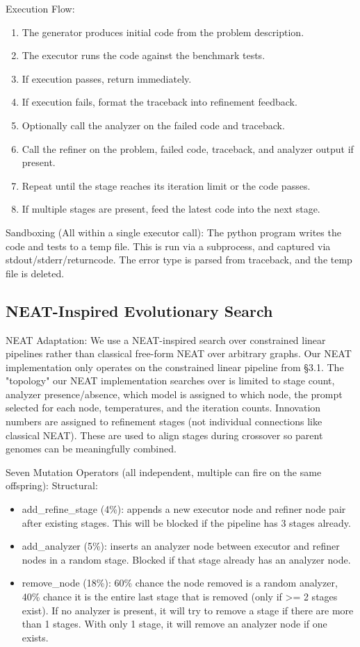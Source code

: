 \documentclass{article}
\begin{document}
Execution Flow:
\begin{enumerate}
    \item The generator produces initial code from the problem description.
    \item The executor runs the code against the benchmark tests.
    \item If execution passes, return immediately.
    \item If execution fails, format the traceback into refinement feedback.
    \item Optionally call the analyzer on the failed code and traceback.
    \item Call the refiner on the problem, failed code, traceback, and analyzer output if present.
    \item Repeat until the stage reaches its iteration limit or the code passes.
    \item If multiple stages are present, feed the latest code into the next stage.
\end{enumerate}

Sandboxing (All within a single executor call):
The python program writes the code and tests to a temp file. This is run via a subprocess, and captured via stdout/stderr/returncode. The error type is parsed from traceback, and the temp file is deleted.

\subsection{NEAT-Inspired Evolutionary Search}
NEAT Adaptation:
We use a NEAT-inspired search over constrained linear pipelines rather than classical free-form NEAT over arbitrary graphs. Our NEAT implementation only operates on the constrained linear pipeline from \S3.1. The "topology" our NEAT implementation searches over is limited to stage count, analyzer presence/absence, which model is assigned to which node, the prompt selected for each node, temperatures, and the iteration counts. Innovation numbers are assigned to refinement stages (not individual connections like classical NEAT). These are used to align stages during crossover so parent genomes can be meaningfully combined.

Seven Mutation Operators (all independent, multiple can fire on the same offspring):
Structural:
\begin{itemize}
    \item add\_refine\_stage (4\%): appends a new executor node and refiner node pair after existing stages. This will be blocked if the pipeline has 3 stages already.
    \item add\_analyzer (5\%): inserts an analyzer node between executor and refiner nodes in a random stage. Blocked if that stage already has an analyzer node.
    \item remove\_node (18\%): 60\% chance  the node removed is a random analyzer, 40\% chance it is the entire last stage that is removed (only if >= 2 stages exist). If no analyzer is present, it will try to remove a stage if there are more than 1 stages. With only 1 stage, it will remove an analyzer node if one exists.
\end{itemize}
\end{document}
